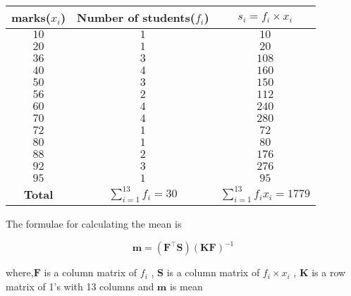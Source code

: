 \documentclass[journal,12pt,twocolumn]{IEEEtran}
\let\vec\mathbf
\providecommand{\brak}[1]{\ensuremath{\left(#1\right)}}
\begin{document}
       \begin{table}[!ht]
            \centering
            \resizebox{\columnwidth}{!}
            {
                \begin{tabular}{|c| c| c| }
                \hline
                 marks($x_{i}$) & Number of students($f_{i}$) & $ s_{i} = f_{i}\times x_{i}$ \\
                 \hline
                 $10$   & $1$ & $10$ \\
                 $20$   & $1$ & $20$ \\
                 $36$   & $3$ & $108$ \\
                 $40$   & $4$ & $160$ \\
                 $50$   & $3$ & $150$ \\
                 $56$   & $2$ & $112$ \\
                 $60$   & $4$ & $240$ \\
                 $70$   & $4$ & $280$ \\
                 $72$   & $1$ & $72$ \\
                 $80$   & $1$ & $80$ \\
                 $88$   & $2$ & $176$ \\
                 $92$   & $3$ & $276$ \\
                 $95$   & $1$ & $95$ \\
                 \hline
                    \textbf{Total} & $\sum_{i=1}^{13} f_{i} = 30$ & $\sum_{i=1}^{13} f_{i}x_{i} = 1779$ \\
                 \hline
                \end{tabular}
            }
            \caption{}
            \label{table:table2}
       \end{table}
       
       
    The formulae for calculating the mean is 
    
    \begin{equation}
       \label{eq:formulae}
       \vec{m} = \brak{\vec{F^{\top}}\vec{S}}\brak{\vec{K}\vec{F}}^{-1}
    \end{equation}
    
    where,$\vec{F}$ is a column matrix of $f_{i}$ , $\vec{S}$ is a column matrix of $f_{i}\times x_{i}$ , $\vec{K}$ is a row matrix of 1's with 13 columns and $\vec{m}$ is mean 
    
\end{document}
